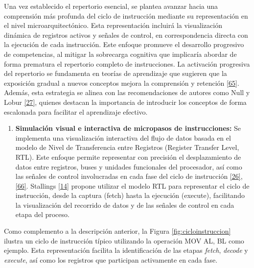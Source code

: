 \documentclass[12pt,oneside]{templates/unerthesis}
\providecommand{\tightlist}{%
  \setlength{\itemsep}{0pt}\setlength{\parskip}{0pt}}
\begin{document}
Una vez establecido el repertorio esencial, se plantea avanzar hacia una comprensión más profunda del ciclo de instrucción mediante su representación en el nivel microarquitectónico. Esta representación incluirá la visualización dinámica de registros activos y señales de control, en correspondencia directa con la ejecución de cada instrucción. Este enfoque promueve el desarrollo progresivo de competencias, al mitigar la sobrecarga cognitiva que implicaría abordar de forma prematura el repertorio completo de instrucciones. La activación progresiva del repertorio se fundamenta en teorías de aprendizaje que sugieren que la exposición gradual a nuevos conceptos mejora la comprensión y retención \protect\hyperlink{ref-sweller2010cognitive}{{[}65{]}}. Además, esta estrategia se alinea con las recomendaciones de autores como Null y Lobur \protect\hyperlink{ref-null_essentials_2023}{{[}27{]}}, quienes destacan la importancia de introducir los conceptos de forma escalonada para facilitar el aprendizaje efectivo.

\begin{enumerate}
\def\labelenumi{\arabic{enumi}.}
\setcounter{enumi}{3}
\tightlist
\item
  \textbf{Simulación visual e interactiva de micropasos de instrucciones:}
  Se implementa una visualización interactiva del flujo de datos basada en el modelo de Nivel de Transferencia entre Registros (Register Transfer Level, RTL). Este enfoque permite representar con precisión el desplazamiento de datos entre registros, buses y unidades funcionales del procesador, así como las señales de control involucradas en cada fase del ciclo de instrucción \protect\hyperlink{ref-harris2015digital}{{[}26{]}}, \protect\hyperlink{ref-ASMVisualizer2025}{{[}66{]}}. Stallings \protect\hyperlink{ref-stallings_computer_2021}{{[}14{]}} propone utilizar el modelo RTL para representar el ciclo de instrucción, desde la captura (fetch) hasta la ejecución (execute), facilitando la visualización del recorrido de datos y de las señales de control en cada etapa del proceso.
\end{enumerate}

Como complemento a la descripción anterior, la Figura \ref{fig:cicloinstruccion} ilustra un ciclo de instrucción típico utilizando la operación MOV AL, BL como ejemplo. Esta representación facilita la identificación de las etapas \emph{fetch}, \emph{decode} y \emph{execute}, así como los registros que participan activamente en cada fase.
\end{document}
